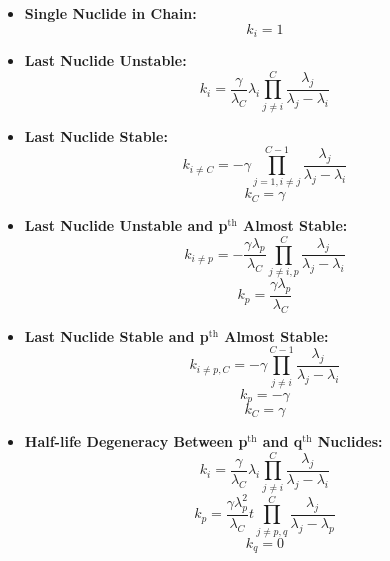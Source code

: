 \documentclass[letterpaper]{physor2018}
\newcommand{\pth}{p$^{\mathrm{th}}$\xspace}
\newcommand{\qth}{q$^{\mathrm{th}}$\xspace}
\begin{document}
\begin{itemize}
\item \textbf{Single Nuclide in Chain:}
\begin{equation}
\label{k-single}
    k_i = 1
\end{equation}
\item \textbf{Last Nuclide Unstable:}
\begin{equation}
\label{k-last-unstable}
    k_i = \frac{\gamma}{\lambda_C} \lambda_i \prod_{j\ne i}^C \frac{\lambda_j}{\lambda_j - \lambda_i}
\end{equation}
\item \textbf{Last Nuclide Stable:}
\begin{equation}
\label{k-last-stable-0}
    k_{i\ne C} = -\gamma \prod_{j=1,i\ne j}^{C-1} \frac{\lambda_j}{\lambda_j - \lambda_i}
\end{equation}
\begin{equation}
\label{k-last-stable-1}
    k_C = \gamma
\end{equation}
\item \textbf{Last Nuclide Unstable and \pth Almost Stable:}
\begin{equation}
\label{k-last-unstable-p-almost-stable-0}
    k_{i\ne p} = -\frac{\gamma\lambda_p}{\lambda_C} \prod_{j\ne i,p}^C \frac{\lambda_j}{\lambda_j - \lambda_i}
\end{equation}
\begin{equation}
\label{k-last-unstable-p-almost-stable-1}
    k_p = \frac{\gamma\lambda_p}{\lambda_C}
\end{equation}
\item \textbf{Last Nuclide Stable and \pth Almost Stable:}
\begin{equation}
\label{k-last-stable-p-almost-stable-0}
    k_{i\ne p,C} = -\gamma \prod_{j\ne i}^{C-1} \frac{\lambda_j}{\lambda_j - \lambda_i}
\end{equation}
\begin{equation}
\label{k-last-stable-p-almost-stable-1}
    k_p = -\gamma
\end{equation}
\begin{equation}
\label{k-last-stable-p-almost-stable-2}
    k_C = \gamma
\end{equation}
\item \textbf{Half-life Degeneracy Between \pth and \qth Nuclides:}
\begin{equation}
\label{k-degen-pq-0}
    k_i = \frac{\gamma}{\lambda_C} \lambda_i \prod_{j\ne i}^C \frac{\lambda_j}{\lambda_j - \lambda_i}
\end{equation}
\begin{equation}
\label{k-degen-pq-1}
    k_p = \frac{\gamma\lambda_p^2}{\lambda_C} t \prod_{j\ne p,q}^C \frac{\lambda_j}{\lambda_j - \lambda_p}
\end{equation}
\begin{equation}
\label{k-degen-pq-1}
    k_q = 0
\end{equation}
\end{itemize}
\end{document}
